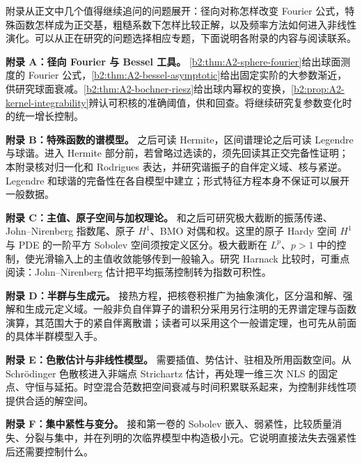 \BookPartGuide[附录导读]

附录从正文中几个值得继续追问的问题展开：径向对称怎样改变 Fourier 公式，特殊函数怎样成为正交基，粗糙系数下怎样比较正解，以及频率方法如何进入非线性演化。可以从正在研究的问题选择相应专题，下面说明各附录的内容与阅读联系。

\ProseParagraphBreak
\noindent\textbf{附录 A：径向 Fourier 与 Bessel 工具。}
\cref{b2:thm:A2-sphere-fourier}给出球面测度的 Fourier 公式，\cref{b2:thm:A2-bessel-asymptotic}给出固定实阶的大参数渐近，供研究球面衰减。\cref{b2:thm:A2-bochner-riesz}给出球内幂权的变换，\cref{b2:prop:A2-kernel-integrability}辨认可积核的准确阈值，供和回查。将继续研究复参数变化时的统一增长控制。

\ProseParagraphBreak
\noindent\textbf{附录 B：特殊函数的谱模型。}
之后可读 Hermite，区间谱理论之后可读 Legendre 与球谐。进入 Hermite 部分前，若曾略过选读的，须先回读其正交完备性证明；本附录核对归一化和 Rodrigues 表达，并研究谐振子的自伴定义域、核与紧逆。Legendre 和球谐的完备性在各自模型中建立；形式特征方程本身不保证可以展开一般数据。

\ProseParagraphBreak
\noindent\textbf{附录 C：主值、原子空间与加权理论。}
和之后可研究极大截断的振荡传递、John--Nirenberg 指数尾、原子 \(H^1\)、BMO 对偶和权。这里的原子 Hardy 空间 \(H^1\) 与 PDE 的一阶平方 Sobolev 空间须按定义区分。极大截断在 \(L^p\)、\(p>1\) 中的控制，使光滑输入上的主值收敛能够传到一般输入。研究 Harnack 比较时，可重点阅读：John--Nirenberg 估计把平均振荡控制转为指数可积性。

\ProseParagraphBreak
\noindent\textbf{附录 D：半群与生成元。}
接热方程，把核卷积推广为抽象演化，区分温和解、强解和生成元定义域。一般非负自伴算子的谱积分采用另行注明的无界谱定理与函数演算，其范围大于的紧自伴离散谱；读者可以采用这个一般谱定理，也可先从前面的具体半群模型入手。

\ProseParagraphBreak
\noindent\textbf{附录 E：色散估计与非线性模型。}
需要插值、势估计、驻相及所用函数空间。从 Schrödinger 色散核进入非端点 Strichartz 估计，再处理一维三次 NLS 的固定点、守恒与延拓。时空混合范数把空间衰减与时间积累联系起来，为控制非线性项提供合适的解空间。

\ProseParagraphBreak
\noindent\textbf{附录 F：集中紧性与变分。}
接和第一卷的 Sobolev 嵌入、弱紧性，比较质量消失、分裂与集中，并在列明的次临界模型中构造极小元。它说明直接法失去强紧性后还需要控制什么。

